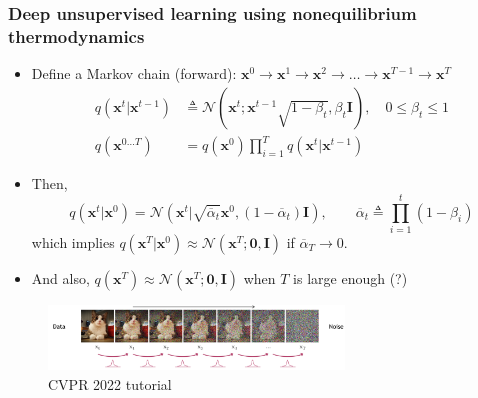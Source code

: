\documentclass[10pt,xcolor={usenames,dvipsnames,table}]{beamer}
\begin{document}
\begin{frame}
    \frametitle{Deep unsupervised learning using nonequilibrium thermodynamics}
    \begin{itemize}
        \item Define a Markov chain (forward): $\bm{x}^{0} \rightarrow \bm{x}^{1} \rightarrow \bm{x}^{2} \rightarrow \ldots \rightarrow \bm{x}^{T-1} \rightarrow \bm{x}^{T}$
            \begin{align*}
                q(\bm{x}^{t}|\bm{x}^{t-1}) &\triangleq \mathcal{N}(\bm{x}^{t}; \bm{x}^{t-1}\sqrt{1-\beta_t}, \beta_t \bm{I}), \quad 0\leq \beta_t \leq 1 \\
                q(\bm{x}^{0\ldots T}) &= q(\bm{x}^{0}) \prod_{i=1}^{T} q(\bm{x}^{t} | \bm{x}^{t-1})
            \end{align*} 
        \item Then, 
    \begin{equation*}
    q(\bm{x}^{t} | \bm{x}^{0}) = \mathcal{N}(\bm{x}^{t}| \sqrt{\overline{\alpha}_t }\bm{x}^{0}, (1- \overline{\alpha}_t) \bm{I}),\quad \quad \overline{\alpha}_t \triangleq \prod_{i=1}^{t} (1- \beta_i)
    \end{equation*}
    which implies 
$q(\bm{x}^{T}|\bm{x}^{0}) \approx \mathcal{N}(\bm{x}^{T}; \bm{0}, \bm{I})$ if $\overline{\alpha}_T \to 0$.
\item And also, $q(\bm{x}^{T}) \approx \mathcal{N}(\bm{x}^{T}; \bm{0}, \bm{I})$ when $T$ is large enough (?)
    \end{itemize}
    \begin{figure}
        \centering
        \includegraphics[width=0.7\textwidth]{images/forward.png}
        \caption{CVPR 2022 tutorial}
    \end{figure}
\end{frame}
\end{document}
